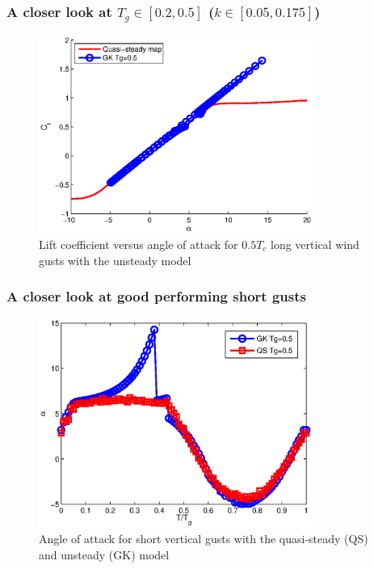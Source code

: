 \documentclass[compress]{beamer}
\begin{document}
\begin{frame}
  \frametitle{A closer look at $T_g \in [0.2,0.5]$ ($k \in [0.05,0.175]$)}
  \begin{figure}[h]
    \centering
    \includegraphics[width=0.8\textwidth]{./Figures/Cl_vs_alpha_wt=1_tg=0p5_alphamax=20.eps}
    \caption{Lift coefficient versus angle of attack for $0.5T_c$ long vertical wind gusts with the unsteady model}
  \end{figure}
\end{frame}

\begin{frame}
  \frametitle{A closer look at good performing short gusts}
  \begin{figure}[h]
    \centering
    \includegraphics[width=0.8\textwidth]{./Figures/alpha_vs_Tg_wt1.eps}
    \caption{Angle of attack for short vertical gusts with the quasi-steady (QS) and unsteady (GK) model}
  \end{figure}
\end{frame}
\end{document}
